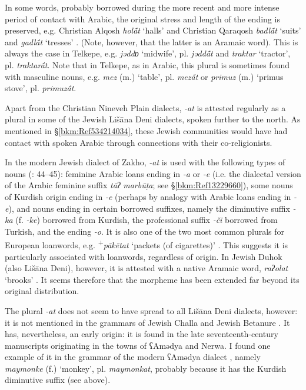 \documentclass[output=paper]{langsci/langscibook}
\begin{document}
In some words, probably borrowed during the more recent and more intense period of contact with Arabic, the original stress and length of the ending is preserved, e.g. Christian Alqosh \textit{hol\'{ā}t} ‘halls’ and Christian Qaraqosh \textit{badl\'{ā}t} ‘suits’ and \textit{gadl\'{ā}t} ‘tresses’ \citep[194]{Khan2002}. (Note, however, that the latter is an Aramaic word). This is always the case in Telkepe, e.g. \textit{jəddɒ} ‘midwife’, pl. \textit{jədd\'{ā}t} and \textit{traktar} ‘tractor’, pl. \textit{traktar\'{ā}t}. Note that in Telkepe, as in Arabic, this plural is sometimes found with masculine nouns, e.g. \textit{mez} (m.) ‘table’, pl. \textit{mez\'{ā}t} or \textit{primuz} (m.) ‘primus stove’, pl. \textit{primuz\'{ā}t}.

Apart from the Christian Nineveh Plain dialects, \textit{\nobreakdash-at} is attested regularly as a plural in some of the Jewish Lišāna Deni dialects, spoken further to the north. As mentioned in §\ref{bkm:Ref534214034}, these Jewish communities would have had contact with spoken Arabic through connections with their co-religionists.

In the modern Jewish dialect of Zakho, \textit{\nobreakdash-at} is used with the following types of nouns (\citealt{Sabar2002}: 44–45): feminine Arabic loans ending in \textit{\nobreakdash-a} or \textit{\nobreakdash-e} (i.e. the dialectal version of the Arabic feminine suffix \textit{tāʔ} \textit{marbūṭa}; see §\ref{bkm:Ref13229660}), some nouns of Kurdish origin ending in \textit{\nobreakdash-e} (perhaps by analogy with Arabic loans ending in \textit{\nobreakdash-e}), and nouns ending in certain borrowed suffixes, namely the diminutive suffix \textit{\nobreakdash-ka} (f. \textit{\nobreakdash-ke}) borrowed from Kurdish, the professional suffix \textit{{}-či} borrowed from Turkish, and the ending \textit{\nobreakdash-o}. It is also one of the two most common plurals for European loanwords, e.g. \textsuperscript{+}\textit{pākētat} ‘packets (of cigarettes)’ \citep[57]{Sabar1990}. This suggests it is particularly associated with loanwords, regardless of origin. In Jewish Duhok (also Lišāna Deni), however, it is attested with a native Aramaic word, \textit{raʔolat} ‘brooks’ \citep[45]{Sabar2002}. It seems therefore that the morpheme has been extended far beyond its original distribution.

The plural \textit{{}-at} does not seem to have spread to all Lišāna Deni dialects, however: it is not mentioned in the grammars of Jewish Challa \citep{Fassberg2010} and Jewish Betanure \citep{Mutzafi2008}. It has, nevertheless, an early origin: it is found in the late seventeenth-century manuscripts originating in the towns of ʕAmədya and Nerwa. I found one example of it in the grammar of the modern ʕAmədya dialect \citep[70]{Greenblatt2011}, namely \textit{maymonke} (f.) ‘monkey’, pl. \textit{maymonkat}, probably because it has the Kurdish diminutive suffix (see above).
\end{document}
